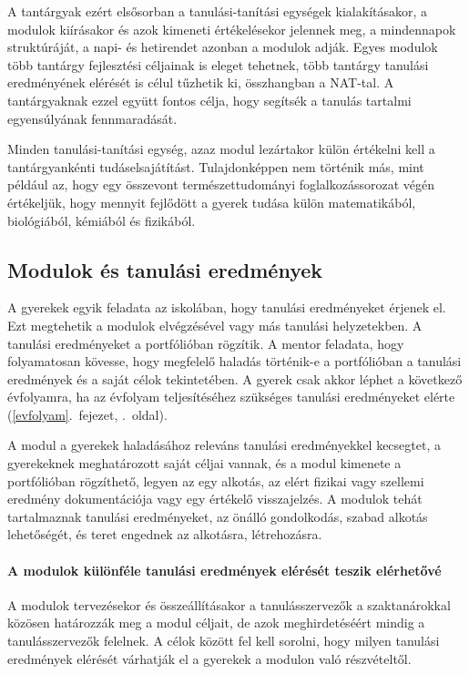 A tantárgyak ezért elsősorban a tanulási-tanítási egységek
kialakításakor, a modulok kiírásakor és azok kimeneti értékelésekor
jelennek meg, a mindennapok struktúráját, a napi- és hetirendet azonban
a modulok adják. Egyes modulok több tantárgy fejlesztési céljainak is
eleget tehetnek, több tantárgy tanulási eredményének elérését is célul
tűzhetik ki, összhangban a NAT-tal. A tantárgyaknak ezzel együtt fontos
célja, hogy segítsék a tanulás tartalmi egyensúlyának fennmaradását.

Minden tanulási-tanítási egység, azaz modul lezártakor külön értékelni
kell a tantárgyankénti tudáselsajátítást. Tulajdonképpen nem történik
más, mint például az, hogy egy összevont természettudományi foglalkozássorozat végén
értékeljük, hogy mennyit fejlődött a gyerek tudása külön matematikából,
biológiából, kémiából és fizikából.

\hypertarget{modulok-es-tanulasi-eredmenyek}{%
\subsection{Modulok és tanulási
eredmények}\label{modulok-es-tanulasi-eredmenyek}}

A gyerekek egyik feladata az iskolában, hogy tanulási eredményeket
érjenek el. Ezt megtehetik a modulok elvégzésével vagy más tanulási
helyzetekben. A tanulási eredményeket a portfólióban rögzítik. A mentor
feladata, hogy folyamatosan kövesse, hogy megfelelő haladás történik-e a
portfólióban a tanulási eredmények és a saját célok tekintetében. A gyerek
csak akkor léphet a következő évfolyamra, ha az
évfolyam teljesítéséhez szükséges tanulási eredményeket elérte (\ref{evfolyam}.~fejezet, \pageref{evfolyam}.~oldal).

A modul a gyerekek haladásához releváns tanulási
eredményekkel kecsegtet, a gyerekeknek meghatározott saját céljai
vannak, és a modul
kimenete a portfólióban rögzíthető, legyen az egy alkotás, az
elért fizikai vagy szellemi eredmény dokumentációja vagy egy értékelő
visszajelzés. A modulok tehát tartalmaznak tanulási eredményeket, az
önálló gondolkodás, szabad alkotás lehetőségét, és teret engednek az
alkotásra, létrehozásra.

\hypertarget{a-modulok-kulonfele-tanulasi-eredmenyek-elereset-teszik-elerhetove}{%
\paragraph{A modulok különféle tanulási eredmények elérését teszik
elérhetővé}\label{a-modulok-kulonfele-tanulasi-eredmenyek-elereset-teszik-elerhetove}}\hfil\break
A modulok tervezésekor és összeállításakor a tanulásszervezők a
szaktanárokkal közösen határozzák meg a modul céljait, de azok
meghirdetéséért mindig a tanulásszervezők felelnek. A célok között fel
kell sorolni, hogy milyen tanulási eredmények elérését várhatják el a
gyerekek a modulon való részvételtől.

